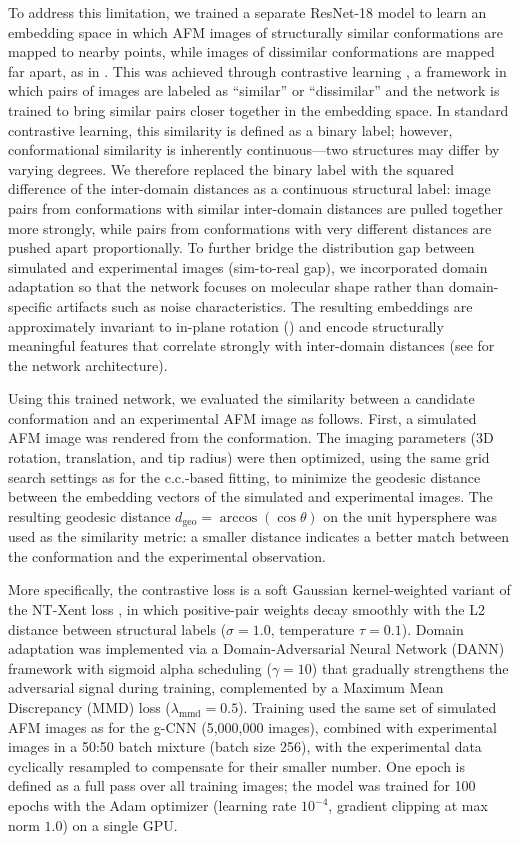 To address this limitation, we trained a separate ResNet-18 model \cite{He2016} to learn an embedding space in which AFM images of structurally similar conformations are mapped to nearby points, while images of dissimilar conformations are mapped far apart, as in \cite{Dingeldein2025Amortized}.
This was achieved through contrastive learning \cite{chen2020simple}, a framework in which pairs of images are labeled as ``similar'' or ``dissimilar'' and the network is trained to bring similar pairs closer together in the embedding space.
In standard contrastive learning, this similarity is defined as a binary label; however, conformational similarity is inherently continuous---two structures may differ by varying degrees.
We therefore replaced the binary label with the squared difference of the inter-domain distances as a continuous structural label: image pairs from conformations with similar inter-domain distances are pulled together more strongly, while pairs from conformations with very different distances are pushed apart proportionally.
To further bridge the distribution gap between simulated and experimental images (sim-to-real gap), we incorporated domain adaptation \cite{Ganin2016} so that the network focuses on molecular shape rather than domain-specific artifacts such as noise characteristics.
The resulting embeddings are approximately invariant to in-plane rotation () and encode structurally meaningful features that correlate strongly with inter-domain distances (see  for the network architecture).

Using this trained network, we evaluated the similarity between a candidate conformation and an experimental AFM image as follows.
First, a simulated AFM image was rendered from the conformation.
The imaging parameters (3D rotation, translation, and tip radius) were then optimized, using the same grid search settings as for the c.c.-based fitting, to minimize the geodesic distance
between the embedding vectors of the simulated and experimental images.
The resulting geodesic distance $d_{\mathrm{geo}} = \arccos(\cos\theta)$ on the unit hypersphere was used as the similarity metric:
a smaller distance indicates a better match between the conformation and the experimental observation.

More specifically, the contrastive loss is a soft Gaussian kernel-weighted variant of the NT-Xent loss \cite{chen2020simple}, in which positive-pair weights decay smoothly with the L2 distance between structural labels ($\sigma = 1.0$, temperature $\tau = 0.1$).
Domain adaptation was implemented via a Domain-Adversarial Neural Network (DANN) framework \cite{Ganin2016} with sigmoid alpha scheduling ($\gamma = 10$) that gradually strengthens the adversarial signal during training, complemented by a Maximum Mean Discrepancy (MMD) loss ($\lambda_{\mathrm{mmd}} = 0.5$).
Training used the same set of simulated AFM images as for the g-CNN (5,000,000 images), combined with experimental images in a 50:50 batch mixture (batch size 256), with the experimental data cyclically resampled to compensate for their smaller number.
One epoch is defined as a full pass over all training images; the model was trained for 100 epochs with the Adam optimizer (learning rate $10^{-4}$, gradient clipping at max norm $1.0$) on a single GPU.
